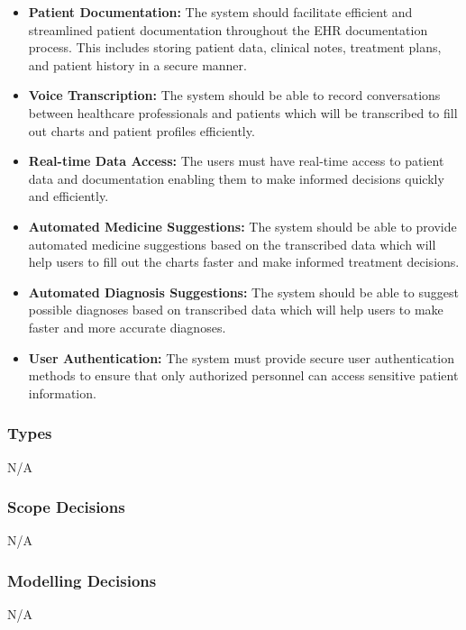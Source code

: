 \documentclass[12pt]{article}
\begin{document}
\begin{itemize}
  \item \textbf{Patient Documentation:} The system should facilitate efficient and streamlined patient documentation throughout the EHR documentation process. This includes storing patient data, clinical notes, treatment plans, and patient history in a secure manner.
  
  \item \textbf{Voice Transcription:} The system should be able to record conversations between healthcare professionals and patients which will be transcribed to fill out charts and patient profiles efficiently.
  
  \item \textbf{Real-time Data Access:} The users must have real-time access to patient data and documentation enabling them to make informed decisions quickly and efficiently.
  
  \item \textbf{Automated Medicine Suggestions:} The system should be able to provide automated medicine suggestions based on the transcribed data which will help users to fill out the charts faster and make informed treatment decisions.
  
  \item \textbf{Automated Diagnosis Suggestions:} The system should be able to suggest possible diagnoses based on transcribed data which will help users to make faster and more accurate diagnoses.
  
  \item \textbf{User Authentication:} The system must provide secure user authentication methods to ensure that only authorized personnel can access sensitive patient information.
  
\end{itemize}

\subsubsection{Types} \label{sec_Types}
N/A

\subsubsection{Scope Decisions} \label{sec_ScopeDecisions}
N/A

\subsubsection{Modelling Decisions} \label{sec_ModellingDecisions}
N/A
\end{document}
